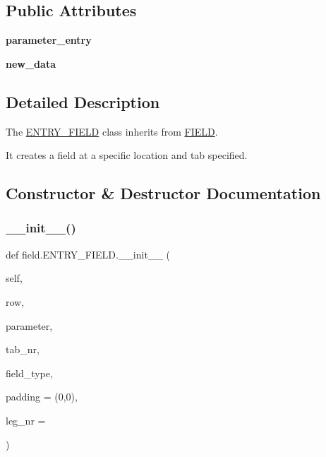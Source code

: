\subsection*{Public Attributes}
\begin{DoxyCompactItemize}
\item 
\mbox{\label{classfield_1_1ENTRY__FIELD_ad8d12c414c80ebc1dc029c1497e197c8}} 
{\bfseries parameter\+\_\+entry}
\item 
\mbox{\label{classfield_1_1ENTRY__FIELD_a117974a0590e90cf86e9e90af2cc7eff}} 
{\bfseries new\+\_\+data}
\end{DoxyCompactItemize}


\subsection{Detailed Description}
The \hyperlink{classfield_1_1ENTRY__FIELD}{E\+N\+T\+R\+Y\+\_\+\+F\+I\+E\+LD} class inherits from \hyperlink{classfield_1_1FIELD}{F\+I\+E\+LD}. 

It creates a field at a specific location and tab specified. 

\subsection{Constructor \& Destructor Documentation}
\mbox{\label{classfield_1_1ENTRY__FIELD_a9b1f1028d872599a49fc24758320fc96}} 
\subsubsection{\texorpdfstring{\+\_\+\+\_\+init\+\_\+\+\_\+()}{\_\_init\_\_()}}
{\footnotesize\ttfamily def field.\+E\+N\+T\+R\+Y\+\_\+\+F\+I\+E\+L\+D.\+\_\+\+\_\+init\+\_\+\+\_\+ (\begin{DoxyParamCaption}\item[{}]{self,  }\item[{}]{row,  }\item[{}]{parameter,  }\item[{}]{tab\+\_\+nr,  }\item[{}]{field\+\_\+type,  }\item[{}]{padding = {\ttfamily (0,0)},  }\item[{}]{leg\+\_\+nr = {} }\end{DoxyParamCaption})}



